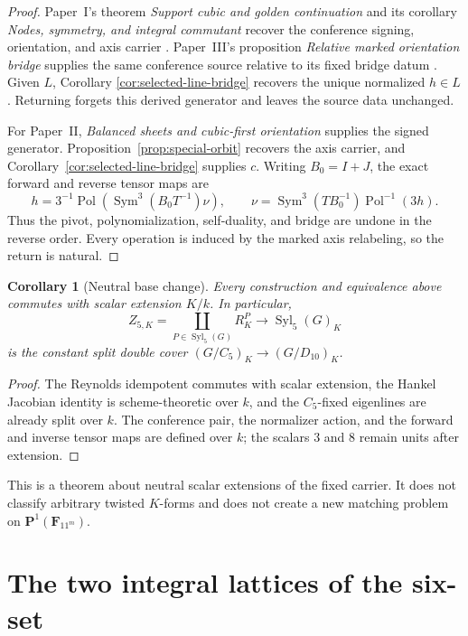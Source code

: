 \documentclass[11pt]{article}
\newtheorem{corollary}[theorem]{Corollary}
\theoremstyle{definition}
\theoremstyle{remark}
\newcommand{\F}{\mathbf F}
\newcommand{\PP}{\mathbf P}
\newcommand{\Sym}{\operatorname{Sym}}
\begin{document}
\begin{proof}
Paper~I's theorem \emph{Support cubic and golden continuation} and its
corollary \emph{Nodes, symmetry, and integral commutant} recover the
conference signing, orientation, and axis carrier
\cite{RuddRigidity2026}.  Paper~III's proposition \emph{Relative marked
orientation bridge} supplies the same conference source relative to its
fixed bridge datum \cite{RuddPassages2026}.  Given \(L\), Corollary
\ref{cor:selected-line-bridge} recovers the unique normalized \(h\in L\).
Returning forgets this derived generator and leaves the source data
unchanged.

For Paper~II, \emph{Balanced sheets and cubic-first orientation} supplies
the signed generator.  Proposition~\ref{prop:special-orbit} recovers the
axis carrier, and Corollary~\ref{cor:selected-line-bridge} supplies \(c\).
Writing \(B_0=I+J\), the exact forward and reverse tensor maps are
\[
 h=3^{-1}\operatorname{Pol}\!\left(\Sym^3(B_0T^{-1})\nu\right),
 \qquad
 \nu=\Sym^3(TB_0^{-1})\operatorname{Pol}^{-1}(3h).
\]
Thus the pivot, polynomialization, self-duality, and bridge are undone in
the reverse order.  Every operation is induced by the marked axis
relabeling, so the return is natural.
\end{proof}

\begin{corollary}[Neutral base change]
\label{cor:stabilizer-stratified-base-change}
Every construction and equivalence above commutes with scalar extension
\(K/k\).  In particular,
\[
 Z_{5,K}=\coprod_{P\in\operatorname{Syl}_5(G)}R_K^P
       \longrightarrow \operatorname{Syl}_5(G)_K
\]
is the constant split double cover
\((G/C_5)_K\to(G/D_{10})_K\).
\end{corollary}

\begin{proof}
The Reynolds idempotent commutes with scalar extension, the Hankel Jacobian
identity is scheme-theoretic over \(k\), and the \(C_5\)-fixed eigenlines are
already split over \(k\).  The conference pair, the normalizer action, and
the forward and inverse tensor maps are defined over \(k\); the scalars \(3\)
and \(8\) remain units after extension.
\end{proof}

This is a theorem about neutral scalar extensions of the fixed carrier.  It
does not classify arbitrary twisted \(K\)-forms and does not create a new
matching problem on \(\PP^1(\F_{11^m})\).

\section{The two integral lattices of the six-set}
\label{sec:lattice-tower}
\end{document}
